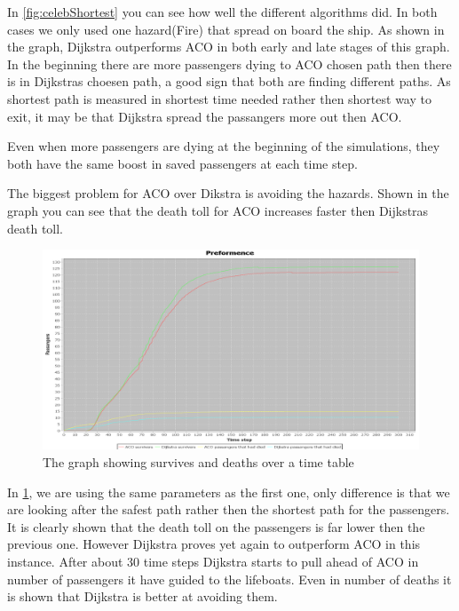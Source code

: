 In \ref{fig:celebShortest} you can see how well the different algorithms did. In both cases we only used one hazard(Fire) that spread on board the ship. As shown in the graph, Dijkstra outperforms ACO in both early and late stages of this graph. In the beginning there are more passengers dying to ACO chosen path then there is in Dijkstras choesen path, a good sign that both are finding different paths. As shortest path is measured in shortest time needed rather then shortest way to exit, it may be that Dijkstra spread the passangers more out then ACO.

Even when more passengers are dying at the beginning of the simulations, they both have the same boost in saved passengers at each time step.

The biggest problem for ACO over Dikstra is avoiding the hazards. Shown in the graph you can see that the death toll for ACO increases faster then Dijkstras death toll.

\begin{figure} [h]
\centering
\hspace*{-5.5in}
\includegraphics[scale=0.35]{images/Graph using 200 rounds 140 passangers and safest first one hazzard.png}
\caption{The graph showing survives and deaths over a time table}
\label{fig:celebSafty}
\end{figure}

In \ref{fig:celebSafty}, we are using the same parameters as the first one, only difference is that we are looking after the safest path rather then the shortest path for the passengers. It is clearly shown that the death toll on the passengers is far lower then the previous one.
However Dijkstra proves yet again to outperform ACO in this instance. After about 30 time steps Dijkstra starts to pull ahead of ACO in number of passengers it have guided to the lifeboats. Even in number of deaths it is shown that Dijkstra is better at avoiding them.

